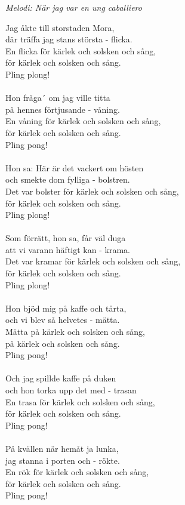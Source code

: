 {\footnotesize\textit{Melodi: När jag var en ung caballiero}}\par
\vspace{10pt}
Jag åkte till storstaden Mora,\\
där träffa jag stans största - flicka.\\
En flicka för kärlek och solsken och sång,\\
för kärlek och solsken och sång.\\
Pling plong!\\
\\
Hon fråga´ om jag ville titta\\
på hennes förtjusande - våning.\\
En våning för kärlek och solsken och sång,\\
för kärlek och solsken och sång.\\
Pling pong!\\
\\
Hon sa: Här är det vackert om hösten\\
och smekte dom fylliga - bolstren.\\
Det var bolster för kärlek och solsken och sång,\\
för kärlek och solsken och sång.\\
Pling plong!\\
\\
Som förrätt, hon sa, får väl duga\\
att vi varann häftigt kan - krama.\\
Det var kramar för kärlek och solsken och sång,\\
för kärlek och solsken och sång.\\
Pling plong!\\
\\
Hon bjöd mig på kaffe och tårta,\\
och vi blev så helvetes - mätta.\\
Mätta på kärlek och solsken och sång,\\
på kärlek och solsken och sång.\\
Pling pong!\\
\\
Och jag spillde kaffe på duken\\
och hon torka upp det med - trasan\\
En trasa för kärlek och solsken och sång,\\
för kärlek och solsken och sång.\\
Pling pong!\\
\\
På kvällen när hemåt ja lunka,\\
jag stanna i porten och - rökte.\\
En rök för kärlek och solsken och sång,\\
för kärlek och solsken och sång.\\
Pling pong!\\
